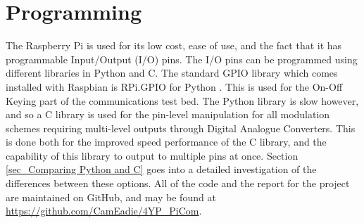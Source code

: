 \documentclass[../main.tex]{subfiles}
\begin{document}
\section{Programming}

The Raspberry Pi is used for its low cost, ease of use, and the fact that it has programmable Input/Output (I/O) pins.
The I/O pins can be programmed using different libraries in Python and C.
The standard GPIO library which comes installed with Raspbian is RPi.GPIO for Python \cite{lib_RPi.GPIO}.
This is used for the On-Off Keying part of the communications test bed.
The Python library is slow however, and so a C library is used for the pin-level manipulation for all modulation schemes requiring multi-level outputs through Digital Analogue Converters.
This is done both for the improved speed performance of the C library, and the capability of this library to output to multiple pins at once.
Section \ref{sec_Comparing Python and C} goes into a detailed  investigation of the differences between these options.
All of the code and the report for the project are maintained on GitHub, and may be found at \url{https://github.com/CamEadie/4YP_PiCom}.\\
\end{document}
